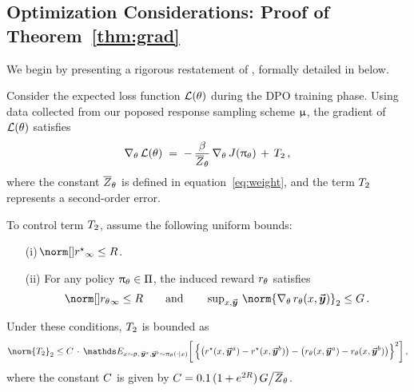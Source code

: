 	\subsection{Optimization Considerations: Proof of Theorem~\ref{thm:grad} \yaqidone}
	\label{sec:proof:thm:grad}


        We begin by presenting a rigorous restatement of , formally detailed in  below.

        \begin{theorem}
			\label{thm:grad_full}
			Consider the expected loss function $\mathcal{L}(\theta)$ during the DPO training phase. Using data collected from our poposed response sampling scheme $ \upmu $, the gradient of $ \mathcal{L}(\theta) $ satisfies
			\begin{align*}
				\nabla_{\theta} \,  \mathcal{L}(\theta) \; = \;
				- \, \frac{\beta}{\overline{Z}_{\theta}} \, \nabla_{\theta} \,  J(\uppi_{\theta}) \, + \, T_2 \, ,
			\end{align*}
			where the constant $ \overline{Z}_{\theta} $ is defined in equation~\eqref{eq:weight}, and the term $ \Term_2%
			$ represents a second-order error.
			
			To control term $ T_2 $, assume the following uniform bounds: 
            \begin{itemize}
                \item[(i)] \mbox{$\!\supnorm{\rewardstar} \leq \Radius$}.
                \item[(ii)] For any policy \mbox{$\uppi_{\theta} \in \Pi$}, the induced reward $r_{\theta}$ satisfies 
                \begin{align*}
                    \supnorm{\rewardtheta} \leq \Radius \qquad \mbox{and} \qquad \sup\nolimits_{\prompt, \response} \, \norm{\gradtheta \rewardtheta (\prompt, \response)}_2 \leq \RadiusGrad \, .
                \end{align*}
            \end{itemize}
			Under these conditions, $ T_2 $ is bounded as
			\vspace{-.5em}
			\begin{align*}
                \norm{\Term_2}_2 \leq 
                \Const{} \, \cdot \, \Exp_{\prompt \sim \promptdistr, \, \responseone, \responsetwo \sim \policytheta(\cdot \mid \prompt)}
				\bigg[ \, \Big\{ \big( \rewardstar(\context, \responseone) - \rewardstar(\context, \responsetwo) \big)
                - \big( \rewardtheta(\context, \responseone) - \rewardtheta(\context, \responsetwo) \big) \Big\}^2 \bigg] \, ,
			\end{align*}
			where the constant $C{}$ is given by $C{} = 0.1 \, (1 + e^{2R}) \, G \big/ \overline{Z}_{\theta}$.
		\end{theorem}
	
